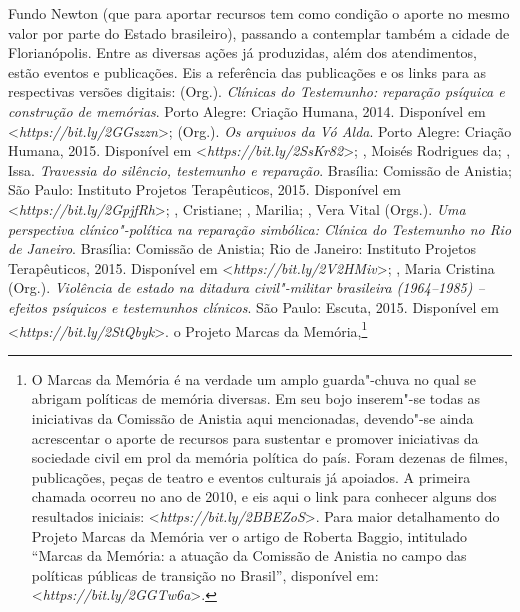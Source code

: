 {  Fundo Newton (que para aportar recursos tem como condição o aporte no
  mesmo valor por parte do Estado brasileiro), passando a contemplar
  também a cidade de Florianópolis. Entre as diversas ações já
  produzidas, além dos atendimentos, estão eventos e publicações. Eis a
  referência das publicações e os links para as respectivas versões
  digitais:  (Org.).
  \emph{Clínicas do Testemunho: reparação psíquica e construção de
  memórias}. Porto Alegre: Criação Humana, 2014. Disponível em
  \textless{}\emph{https://bit.ly/2GGszzn}\textgreater{};
   (Org.). \emph{Os
  arquivos da Vó Alda}. Porto Alegre: Criação Humana, 2015. Disponível
  em \textless{}\emph{https://bit.ly/2SsKr82}\textgreater{}; , Moisés
  Rodrigues da; , Issa. \emph{Travessia do silêncio,
  testemunho e reparação}. Brasília: Comissão de Anistia; São Paulo:
  Instituto Projetos Terapêuticos, 2015. Disponível em
  \textless{}\emph{https://bit.ly/2GpjfRh}\textgreater{};
  , Cristiane; ,
  Marilia; , Vera Vital (Orgs.). \emph{Uma perspectiva
  clínico"-política na reparação simbólica: Clínica do Testemunho no Rio
  de Janeiro}. Brasília: Comissão de Anistia; Rio de Janeiro: Instituto
  Projetos Terapêuticos, 2015. Disponível em
  \textless{}\emph{https://bit.ly/2V2HMiv}\textgreater{};
  , Maria Cristina (Org.).
  \emph{Violência de estado na ditadura civil"-militar brasileira
  (1964--1985) -- efeitos psíquicos e testemunhos clínicos}. São Paulo:
  Escuta, 2015. Disponível em \textless{}\emph{https://bit.ly/2StQbyk}\textgreater{}.}
  o Projeto Marcas da Memória,\footnote{O
  Marcas da Memória é na verdade um amplo guarda"-chuva no qual se
  abrigam políticas de memória diversas. Em seu bojo inserem"-se todas as
  iniciativas da Comissão de Anistia aqui mencionadas, devendo"-se ainda
  acrescentar o aporte de recursos para sustentar e promover iniciativas
  da sociedade civil em prol da memória política do país. Foram dezenas
  de filmes, publicações, peças de teatro e eventos culturais já
  apoiados. A primeira chamada ocorreu no ano de 2010, e eis aqui o
  link para conhecer alguns dos resultados iniciais:
  \textless{}\emph{https://bit.ly/2BBEZoS}\textgreater{}.
  Para maior detalhamento do Projeto Marcas da Memória ver o artigo de
  Roberta Baggio, intitulado ``Marcas da Memória: a atuação da Comissão
      de Anistia no campo das políticas públicas de transição no Brasil'',
  disponível em: \textless{}\emph{https://bit.ly/2GGTw6a}\textgreater{}.}
